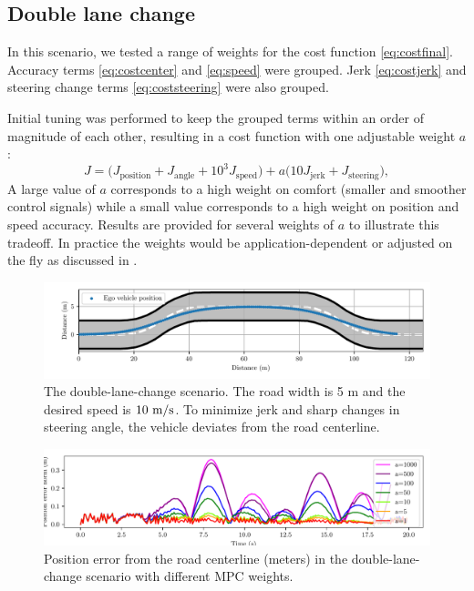 \documentclass[letterpaper, 10 pt, conference]{ieeeconf}  %
\begin{document}
 \subsection{Double lane change}
 
In this scenario, we tested a range of weights for the cost function \eqref{eq:costfinal}. Accuracy terms \eqref{eq:costcenter} and \eqref{eq:speed} were grouped. Jerk \eqref{eq:costjerk} and steering change terms \eqref{eq:coststeering} were also grouped.
 
 Initial tuning was performed to keep the grouped terms within an order of magnitude of each other, resulting in a cost function with one adjustable weight $a$:
 $$J = \Big( J_{\text{position}} + J_{\text{angle}} + 10^3J_{\text{speed}} \Big) + a\Big( 10J_\text{{jerk}} + J_{\text{steering}}\Big),$$
 A large value of $a$ corresponds to a high weight on comfort (smaller and smoother control signals) while a small value corresponds to a high weight on position and speed accuracy.
 Results are provided for several weights of $a$ to illustrate this tradeoff.
 In practice the weights would be application-dependent or adjusted on the fly as discussed in \cite{nmpc_micheli}.
 
 
 \begin{figure}[h]
 	\centering
 	\includegraphics[width=1.0\linewidth]{figures/double_lane_change.pdf}
 	\caption{The double-lane-change scenario. The road width is 5 m and the desired speed is $10\ \text{m}/\text{s}$. To minimize jerk and sharp changes in steering angle, the vehicle deviates from the road centerline.}
 	\label{fig:trajectory(lanechange)}
 \end{figure}
 
 
 \begin{figure}[h]
 	\centering
 	\includegraphics[width=1.0\linewidth]{figures/Position_error(lanechange).pdf}
 	\caption{Position error from the road centerline (meters) in the double-lane-change scenario with different MPC weights.}
 	\label{fig:error(lanechange)}
 \end{figure}
 
\end{document}
